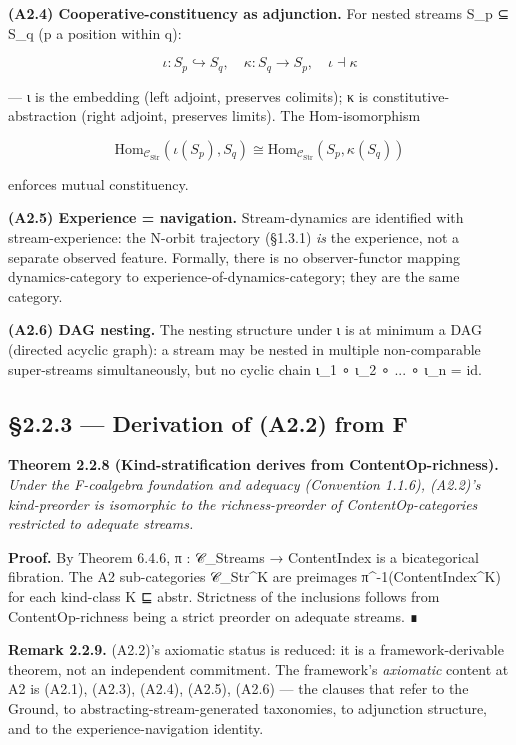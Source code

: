 \documentclass[11pt, openany]{book}
\begin{document}
\textbf{(A2.4) Cooperative-constituency as adjunction.} For nested streams S\_\allowbreak{}p ⊆ S\_\allowbreak{}q (p a position within q):

\[
\iota : S_p \hookrightarrow S_q,\quad \kappa : S_q \to S_p,\quad \iota \dashv \kappa
\]

--- ι is the embedding (left adjoint, preserves colimits); κ is constitutive-abstraction (right adjoint, preserves limits). The Hom-isomorphism

\[
\mathrm{Hom}_{\mathcal{C}_\mathrm{Str}}(\iota(S_p), S_q) \cong \mathrm{Hom}_{\mathcal{C}_\mathrm{Str}}(S_p, \kappa(S_q))
\]

enforces mutual constituency.

\textbf{(A2.5) Experience = navigation.} Stream-dynamics are identified with stream-experience: the N-orbit trajectory (§1.3.1) \textit{is} the experience, not a separate observed feature. Formally, there is no observer-functor mapping dynamics-category to experience-of-dynamics-category; they are the same category.

\textbf{(A2.6) DAG nesting.} The nesting structure under ι is at minimum a DAG (directed acyclic graph): a stream may be nested in multiple non-comparable super-streams simultaneously, but no cyclic chain ι\_\allowbreak{}1 ∘ ι\_\allowbreak{}2 ∘ ... ∘ ι\_\allowbreak{}n = id.

\subsection{§2.2.3 --- Derivation of (A2.2) from F}

\textbf{Theorem 2.2.8 (Kind-stratification derives from ContentOp-richness).} \textit{Under the F-coalgebra foundation and adequacy (Convention 1.1.6), (A2.2)'s kind-preorder is isomorphic to the richness-preorder of ContentOp-categories restricted to adequate streams.}

\textbf{Proof.} By Theorem 6.4.6, π : 𝒞\_\allowbreak{}Streams → ContentIndex is a bicategorical fibration. The A2 sub-categories 𝒞\_\allowbreak{}Str\textasciicircum{}K are preimages π\textasciicircum{}{-1}(ContentIndex\textasciicircum{}K) for each kind-class K ⊑ abstr. Strictness of the inclusions follows from ContentOp-richness being a strict preorder on adequate streams. ∎

\textbf{Remark 2.2.9.} (A2.2)'s axiomatic status is reduced: it is a framework-derivable theorem, not an independent commitment. The framework's \textit{axiomatic} content at A2 is (A2.1), (A2.3), (A2.4), (A2.5), (A2.6) --- the clauses that refer to the Ground, to abstracting-stream-generated taxonomies, to adjunction structure, and to the experience-navigation identity.
\end{document}
